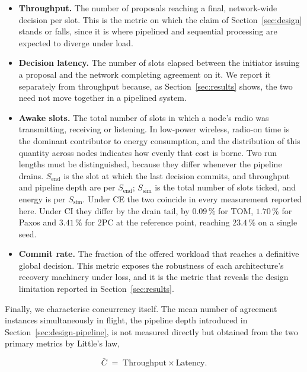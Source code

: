 \documentclass[journal]{IEEEtran}
\newcommand{\CI}{CI}                      %
\newcommand{\CE}{CE}                      %
\newcommand{\Cdepth}{\bar{C}}             %
\newcommand{\Send}{S_{\mathrm{end}}}      %
\newcommand{\Ssim}{S_{\mathrm{sim}}}      %
\begin{document}
\begin{itemize}
\item \textbf{Throughput.} The number of proposals reaching a final,
network-wide decision per slot. This is the metric on which the claim of
Section~\ref{sec:design} stands or falls, since it is where pipelined and
sequential processing are expected to diverge under load.

\item \textbf{Decision latency.} The number of slots elapsed between the
initiator issuing a proposal and the network completing agreement on it.
We report it separately from throughput because, as
Section~\ref{sec:results} shows, the two need not move together in a
pipelined system.

\item \textbf{Awake slots.} The total number of slots in which a node's
radio was transmitting, receiving or listening. In low-power wireless,
radio-on time is the dominant contributor to energy consumption, and the
distribution of this quantity across nodes indicates how evenly that cost
is borne. Two run lengths must be distinguished, because they differ whenever
the pipeline drains. $\Send$ is the slot at which the last decision commits,
and throughput and pipeline depth are per $\Send$; $\Ssim$ is the total number
of slots ticked, and energy is per $\Ssim$. Under \CE{} the two coincide in
every measurement reported here. Under \CI{} they differ by the drain tail,
by $0.09\,\%$ for TOM, $1.70\,\%$ for Paxos and $3.41\,\%$ for 2PC at the
reference point, reaching $23.4\,\%$ on a single seed.

\item \textbf{Commit rate.} The fraction of the offered workload that
reaches a definitive global decision. This metric exposes the robustness
of each architecture's recovery machinery under loss, and it is the
metric that reveals the design limitation reported in
Section~\ref{sec:results}.
\end{itemize}

Finally, we characterise concurrency itself. The mean number of agreement
instances simultaneously in flight, the pipeline depth introduced in
Section~\ref{sec:design-pipeline}, is not measured directly but obtained
from the two primary metrics by Little's law,

\begin{equation}
\label{eq:depth}
\Cdepth \;=\; \text{Throughput} \times \text{Latency} .
\end{equation}
\end{document}
